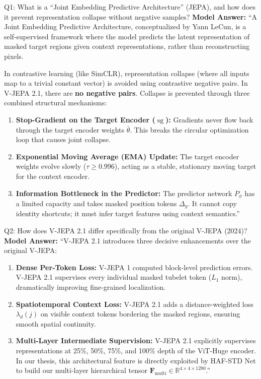 \documentclass[a4paper, 11pt]{article}
\begin{document}
\begin{defensebox}{Q1: What is a ``Joint Embedding Predictive Architecture'' (JEPA), and how does it prevent representation collapse without negative samples?}
\textbf{Model Answer:}
``A Joint Embedding Predictive Architecture, conceptualized by Yann LeCun, is a self-supervised framework where the model predicts the latent representation of masked target regions given context representations, rather than reconstructing pixels.

In contrastive learning (like SimCLR), representation collapse (where all inputs map to a trivial constant vector) is avoided using contrastive negative pairs. In V-JEPA 2.1, there are \textbf{no negative pairs}. Collapse is prevented through three combined structural mechanisms:
\begin{enumerate}
    \item \textbf{Stop-Gradient on the Target Encoder ($\operatorname{sg}$):} Gradients never flow back through the target encoder weights $\bar{\theta}$. This breaks the circular optimization loop that causes joint collapse.
    \item \textbf{Exponential Moving Average (EMA) Update:} The target encoder weights evolve slowly ($\tau \ge 0.996$), acting as a stable, stationary moving target for the context encoder.
    \item \textbf{Information Bottleneck in the Predictor:} The predictor network $P_\phi$ has a limited capacity and takes masked position tokens $\Delta_y$. It cannot copy identity shortcuts; it must infer target features using context semantics.''
\end{enumerate}
\end{defensebox}

\vspace{0.2cm}

\begin{defensebox}{Q2: How does V-JEPA 2.1 differ specifically from the original V-JEPA (2024)?}
\textbf{Model Answer:}
``V-JEPA 2.1 introduces three decisive enhancements over the original V-JEPA:
\begin{enumerate}
    \item \textbf{Dense Per-Token Loss:} V-JEPA 1 computed block-level prediction errors. V-JEPA 2.1 supervises every individual masked tubelet token ($L_1$ norm), dramatically improving fine-grained localization.
    \item \textbf{Spatiotemporal Context Loss:} V-JEPA 2.1 adds a distance-weighted loss $\lambda_d(j)$ on visible context tokens bordering the masked regions, ensuring smooth spatial continuity.
    \item \textbf{Multi-Layer Intermediate Supervision:} V-JEPA 2.1 explicitly supervises representations at 25\%, 50\%, 75\%, and 100\% depth of the ViT-Huge encoder. In our thesis, this architectural feature is directly exploited by HAF-STD Net to build our multi-layer hierarchical tensor $\mathbf{F}_{\text{multi}} \in \mathbb{R}^{4 \times 4 \times 1280}$.''
\end{enumerate}
\end{defensebox}
\end{document}
